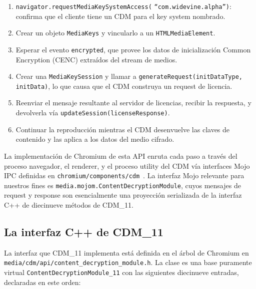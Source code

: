 \documentclass[11pt,letterpaper]{article}
\begin{document}
\begin{enumerate}[itemsep=2pt,topsep=2pt]
  \item \texttt{navigator.requestMediaKeySystemAccess(}
        \texttt{``com.widevine.alpha''}\texttt{)}: confirma que
        el cliente tiene un CDM para el key system nombrado.
  \item Crear un objeto \texttt{MediaKeys} y vincularlo a un
        \texttt{HTMLMediaElement}.
  \item Esperar el evento \texttt{encrypted}, que provee los
        datos de inicialización Common Encryption (CENC)
        extraídos del stream de medios.
  \item Crear una \texttt{MediaKeySession} y llamar a
        \texttt{generateRequest(initDataType, initData)}, lo que
        causa que el CDM construya un request de licencia.
  \item Reenviar el mensaje resultante al servidor de licencias,
        recibir la respuesta, y devolverla vía
        \texttt{updateSession(licenseResponse)}.
  \item Continuar la reproducción mientras el CDM desenvuelve
        las claves de contenido y las aplica a los datos del
        medio cifrado.
\end{enumerate}

La implementación de Chromium de esta API enruta cada paso a
través del proceso navegador, el renderer, y el proceso utility
del CDM vía interfaces Mojo IPC definidas en
\texttt{chromium/components/cdm}~\cite{chromium-cdm-mojo}. La
interfaz Mojo relevante para nuestros fines es
\texttt{media.mojom.ContentDecryptionModule}, cuyos mensajes de
request y response son esencialmente una proyección serializada
de la interfaz C++ de diecinueve métodos de CDM\_11.

\subsection{La interfaz C++ de CDM\_11}
\label{sec:bg-cdm11}

La interfaz que CDM\_11 implementa está definida en el árbol de
Chromium en
\texttt{media/cdm/api/content\_decryption\_module.h}. La clase es
una base puramente virtual \texttt{ContentDecryptionModule\_11}
con las siguientes diecinueve entradas, declaradas en este orden:
\end{document}
